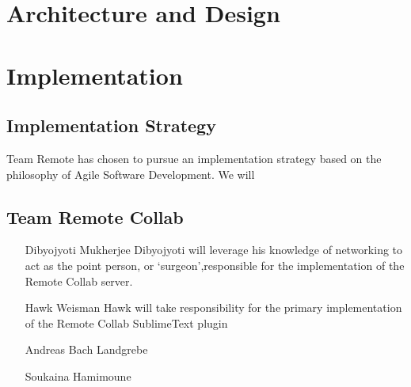 \documentclass[11pt,english]{article}
\begin{document}
\section{Architecture and Design}
\section{Implementation}
	\subsection{Implementation Strategy}
		Team Remote has chosen to pursue an implementation strategy based on the philosophy of Agile Software Development. We will 
	\subsection{Team Remote Collab}
		\begin{itemize}
			\item[Dibyojyoti Mukherjee]{Dibyojyoti will leverage his knowledge of networking to act as the point person, or `surgeon',responsible for the implementation of the Remote Collab server.}
			\item[Hawk Weisman]{Hawk will take responsibility for the primary implementation of the Remote Collab SublimeText plugin}
			\item[Andreas Bach Landgrebe]{}
			\item[Soukaina Hamimoune]{}
		\end{itemize}
	
	
\end{document}
